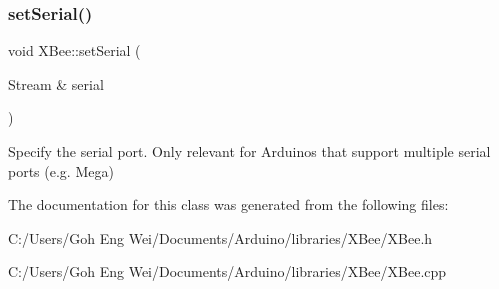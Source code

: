 \subsubsection{\texorpdfstring{set\+Serial()}{setSerial()}}
{\footnotesize\ttfamily void X\+Bee\+::set\+Serial (\begin{DoxyParamCaption}\item[{Stream \&}]{serial }\end{DoxyParamCaption})}

Specify the serial port. Only relevant for Arduinos that support multiple serial ports (e.\+g. Mega) 

The documentation for this class was generated from the following files\+:\begin{DoxyCompactItemize}
\item 
C\+:/\+Users/\+Goh Eng Wei/\+Documents/\+Arduino/libraries/\+X\+Bee/X\+Bee.\+h\item 
C\+:/\+Users/\+Goh Eng Wei/\+Documents/\+Arduino/libraries/\+X\+Bee/X\+Bee.\+cpp\end{DoxyCompactItemize}

